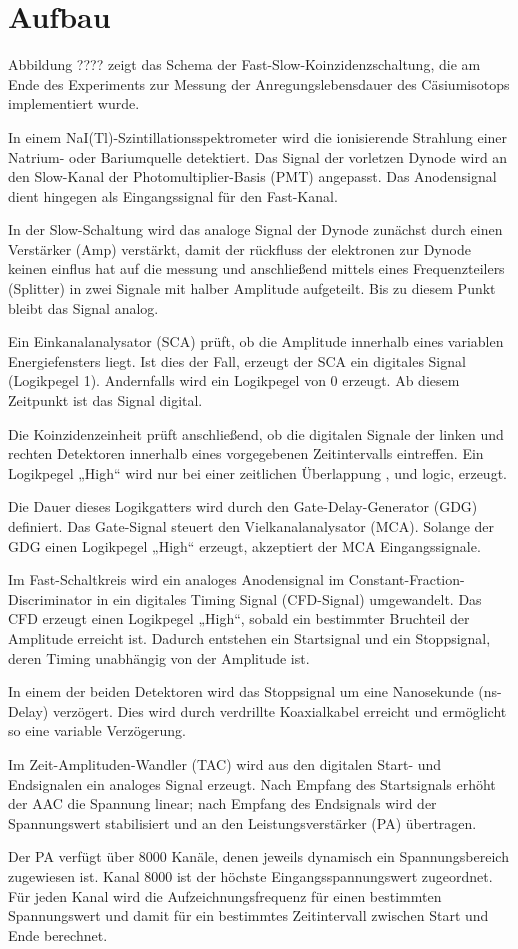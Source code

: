 \chapter{Aufbau}
Abbildung ???? zeigt das Schema der Fast-Slow-Koinzidenzschaltung, die am Ende des Experiments zur Messung der Anregungslebensdauer des Cäsiumisotops implementiert wurde.

In einem NaI(Tl)-Szintillationsspektrometer wird die ionisierende Strahlung einer Natrium- oder Bariumquelle detektiert. 
Das Signal der vorletzen Dynode wird an den Slow-Kanal der Photomultiplier-Basis (PMT) angepasst. 
Das Anodensignal dient hingegen als Eingangssignal für den Fast-Kanal.

In der Slow-Schaltung wird das analoge Signal der Dynode zunächst durch einen Verstärker (Amp) verstärkt, damit der rückfluss der elektronen zur Dynode keinen einflus hat auf die messung und anschließend mittels eines Frequenzteilers (Splitter) in zwei Signale mit halber Amplitude aufgeteilt. 
Bis zu diesem Punkt bleibt das Signal analog.

Ein Einkanalanalysator (SCA) prüft, ob die Amplitude innerhalb eines variablen Energiefensters liegt. 
Ist dies der Fall, erzeugt der SCA ein digitales Signal (Logikpegel 1). 
Andernfalls wird ein Logikpegel von 0 erzeugt. 
Ab diesem Zeitpunkt ist das Signal digital.

Die Koinzidenzeinheit prüft anschließend, ob die digitalen Signale der linken und rechten Detektoren innerhalb eines vorgegebenen Zeitintervalls eintreffen. 
Ein Logikpegel „High“ wird nur bei einer zeitlichen Überlappung , und logic, erzeugt.

Die Dauer dieses Logikgatters wird durch den Gate-Delay-Generator (GDG) definiert. 
Das Gate-Signal steuert den Vielkanalanalysator (MCA). 
Solange der GDG einen Logikpegel „High“ erzeugt, akzeptiert der MCA Eingangssignale.

Im Fast-Schaltkreis wird ein analoges Anodensignal  im Constant-Fraction-Discriminator in ein digitales Timing Signal (CFD-Signal) umgewandelt. 
Das CFD erzeugt einen Logikpegel „High“, sobald ein bestimmter Bruchteil der Amplitude erreicht ist. 
Dadurch entstehen ein Startsignal und ein Stoppsignal, deren Timing unabhängig von der Amplitude ist.

In einem der beiden Detektoren wird das Stoppsignal um eine Nanosekunde (ns-Delay) verzögert. 
Dies wird durch verdrillte Koaxialkabel erreicht und ermöglicht so eine variable Verzögerung.

Im Zeit-Amplituden-Wandler (TAC) wird aus den digitalen Start- und Endsignalen ein analoges Signal erzeugt. 
Nach Empfang des Startsignals erhöht der AAC die Spannung linear; nach Empfang des Endsignals wird der Spannungswert stabilisiert und an den Leistungsverstärker (PA) übertragen.

Der PA verfügt über 8000 Kanäle, denen jeweils dynamisch ein Spannungsbereich zugewiesen ist. 
Kanal 8000 ist der höchste Eingangsspannungswert zugeordnet. 
Für jeden Kanal wird die Aufzeichnungsfrequenz für einen bestimmten Spannungswert und damit für ein bestimmtes Zeitintervall zwischen Start und Ende berechnet.